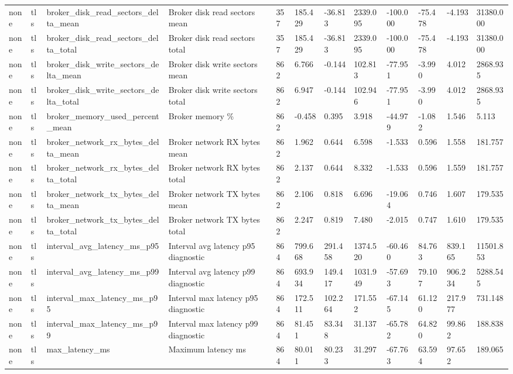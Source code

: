 \begin{longtable}{llllllllllll}
none & tls & broker\_disk\_read\_sectors\_delta\_mean & Broker disk read sectors mean & 357 & 185.429 & -36.813 & 2339.095 & -100.000 & -75.478 & -4.193 & 31380.000 \\
none & tls & broker\_disk\_read\_sectors\_delta\_total & Broker disk read sectors total & 357 & 185.429 & -36.813 & 2339.095 & -100.000 & -75.478 & -4.193 & 31380.000 \\
none & tls & broker\_disk\_write\_sectors\_delta\_mean & Broker disk write sectors mean & 862 & 6.766 & -0.144 & 102.813 & -77.951 & -3.990 & 4.012 & 2868.935 \\
none & tls & broker\_disk\_write\_sectors\_delta\_total & Broker disk write sectors total & 862 & 6.947 & -0.144 & 102.946 & -77.951 & -3.990 & 4.012 & 2868.935 \\
none & tls & broker\_memory\_used\_percent\_mean & Broker memory \% & 862 & -0.458 & 0.395 & 3.918 & -44.979 & -1.082 & 1.546 & 5.113 \\
none & tls & broker\_network\_rx\_bytes\_delta\_mean & Broker network RX bytes mean & 862 & 1.962 & 0.644 & 6.598 & -1.533 & 0.596 & 1.558 & 181.757 \\
none & tls & broker\_network\_rx\_bytes\_delta\_total & Broker network RX bytes total & 862 & 2.137 & 0.644 & 8.332 & -1.533 & 0.596 & 1.559 & 181.757 \\
none & tls & broker\_network\_tx\_bytes\_delta\_mean & Broker network TX bytes mean & 862 & 2.106 & 0.818 & 6.696 & -19.064 & 0.746 & 1.607 & 179.535 \\
none & tls & broker\_network\_tx\_bytes\_delta\_total & Broker network TX bytes total & 862 & 2.247 & 0.819 & 7.480 & -2.015 & 0.747 & 1.610 & 179.535 \\
none & tls & interval\_avg\_latency\_ms\_p95 & Interval avg latency p95 diagnostic & 864 & 799.668 & 291.458 & 1374.520 & -60.460 & 84.763 & 839.165 & 11501.853 \\
none & tls & interval\_avg\_latency\_ms\_p99 & Interval avg latency p99 diagnostic & 864 & 693.934 & 149.417 & 1031.949 & -57.693 & 79.107 & 906.234 & 5288.545 \\
none & tls & interval\_max\_latency\_ms\_p95 & Interval max latency p95 diagnostic & 864 & 172.511 & 102.264 & 171.552 & -67.145 & 61.120 & 217.977 & 731.148 \\
none & tls & interval\_max\_latency\_ms\_p99 & Interval max latency p99 diagnostic & 864 & 81.451 & 83.348 & 31.137 & -65.782 & 64.820 & 99.862 & 188.838 \\
none & tls & max\_latency\_ms & Maximum latency ms & 864 & 80.011 & 80.233 & 31.297 & -67.763 & 63.594 & 97.652 & 189.065 \\

\end{longtable}
